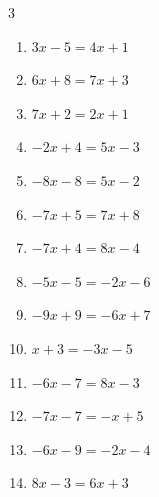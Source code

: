 \begin{multicols}{3}
\begin{enumerate}
        \phantom{$\displaystyle x=-15$}

  \item $3x-5=4x+1$

        \phantom{$\displaystyle x=-6$}

  \item $6x+8=7x+3$

        \phantom{$\displaystyle x=5$}

  \item $7x+2=2x+1$


  \item $-2x+4=5x-3$

        \phantom{$\displaystyle x=1$}

\columnbreak %

  \item $-8x-8=5x-2$


  \item $-7x+5=7x+8$


  \item $-7x+4=8x-4$


  \item $-5x-5=-2x-6$


  \item $-9x+9=-6x+7$


  \item $x+3=-3x-5$

        \phantom{$\displaystyle x=-2$}

  \item $-6x-7=8x-3$


  \item $-7x-7=-x+5$

        \phantom{$\displaystyle x=-2$}

  \item $-6x-9=-2x-4$


  \item $8x-3=6x+3$


\end{enumerate}
\end{multicols}
